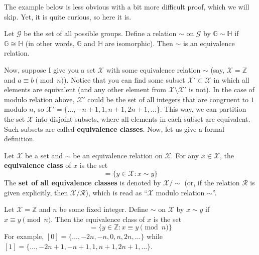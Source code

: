 \documentclass[../lecture-notes-148x210.tex]{subfiles}
\begin{document}
The example below is less obvious with a bit more difficult proof, which we will skip. Yet, it is quite curious, so here it is.

\begin{example}
    Let $\mathcal{G}$ be the set of all possible groups. Define a relation $\sim$ on $\mathcal{G}$ by $\mathbb{G} \sim \mathbb{H}$ if $\mathbb{G} \cong \mathbb{H}$ (in other words, $\mathbb{G}$ and $\mathbb{H}$ are isomorphic). Then $\sim$ is an equivalence relation.
\end{example}

Now, suppose I give you a set $\mathcal{X}$ with some equivalence relation $\sim$ (say, $\mathcal{X} = \mathbb{Z}$ and $a \equiv b \pmod{n}$). Notice that you can find some subset $\mathcal{X}' \subset \mathcal{X}$ in which all elements are equivalent (and any other element from $\mathcal{X} \setminus \mathcal{X}'$ is not). In the case of modulo relation above, $\mathcal{X}'$ could be the set of all integers that are congruent to $1$ modulo $n$, so $\mathcal{X}' = \{\dots,-n+1,1,n+1,2n+1,\dots\}$. This way, we can partition the set $\mathcal{X}$ into disjoint subsets, where all elements in each subset are equivalent. Such subsets are called \textbf{equivalence classes}. Now, let us give a formal definition.

\begin{definition}
    Let $\mathcal{X}$ be a set and $\sim$ be an equivalence relation on $\mathcal{X}$. For any $x \in \mathcal{X}$, the \textbf{equivalence class} of $x$ is the set
    \begin{equation*}
        [x] = \{y \in \mathcal{X}: x \sim y\}
    \end{equation*}
    The \textbf{set of all equivalence classes} is denoted by $\mathcal{X}/\text{$\sim$}$ (or, if the relation $\mathcal{R}$ is given explicitly, then $\mathcal{X}/\mathcal{R}$), which is read as ``$\mathcal{X}$ modulo relation $\sim$''.
\end{definition}

\begin{example}
    Let $\mathcal{X} = \mathbb{Z}$ and $n$ be some fixed integer. Define $\sim$ on $\mathcal{X}$ by $x \sim y$ if $x \equiv y \pmod{n}$. Then the equivalence class of $x$ is the set
    \begin{equation*}
        [x] = \{y \in \mathbb{Z}: x \equiv y \pmod{n}\}
    \end{equation*}
    For example, $[0] = \{\ldots,-2n,-n,0,n,2n,\ldots\}$ while $[1] = \{\ldots,-2n+1,-n+1,1,n+1,2n+1,\ldots\}$.
\end{example}
\end{document}
